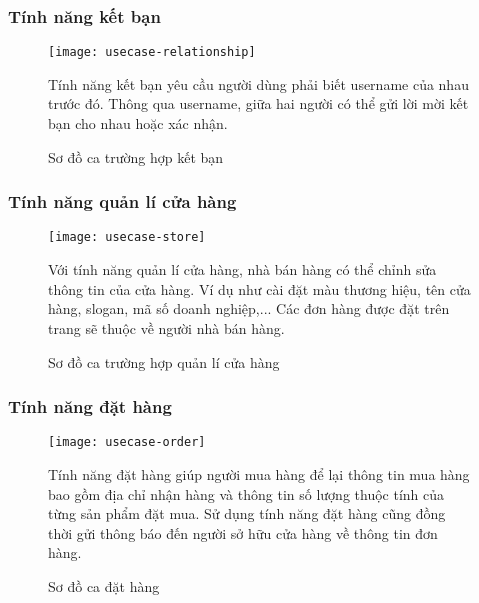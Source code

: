 \subsubsection{Tính năng kết bạn}
\begin{figure}[hbt!]\fontsize{13px}{13px}\selectfont
\centering
		\texttt{[image: usecase-relationship]}
		\caption{Sơ đồ ca trường hợp kết bạn}
\justifying
Tính năng kết bạn yêu cầu người dùng phải biết username của nhau trước đó. Thông qua username, giữa hai người có thể gửi lời mời kết bạn cho nhau hoặc xác nhận.
\end{figure}

\clearpage
\subsubsection{Tính năng quản lí cửa hàng}
\begin{figure}[hbt!]\fontsize{13px}{13px}\selectfont
\centering
		\texttt{[image: usecase-store]}
		\caption{Sơ đồ ca trường hợp quản lí cửa hàng}
\justifying
Với tính năng quản lí cửa hàng, nhà bán hàng có thể chỉnh sửa thông tin của cửa hàng. Ví dụ như cài đặt màu thương hiệu, tên cửa hàng, slogan, mã số doanh nghiệp,... Các đơn hàng được đặt trên trang sẽ thuộc về người nhà bán hàng.
\end{figure}

\subsubsection{Tính năng đặt hàng}
\begin{figure}[hbt!]\fontsize{13px}{13px}\selectfont
\centering
		\texttt{[image: usecase-order]}
		\caption{Sơ đồ ca đặt hàng}
\justifying
Tính năng đặt hàng giúp người mua hàng để lại thông tin mua hàng bao gồm địa chỉ nhận hàng và thông tin số lượng thuộc tính của từng sản phẩm đặt mua. Sử dụng tính năng đặt hàng cũng đồng thời gửi thông báo đến người sở hữu cửa hàng về thông tin đơn hàng.
\end{figure}


\clearpage
